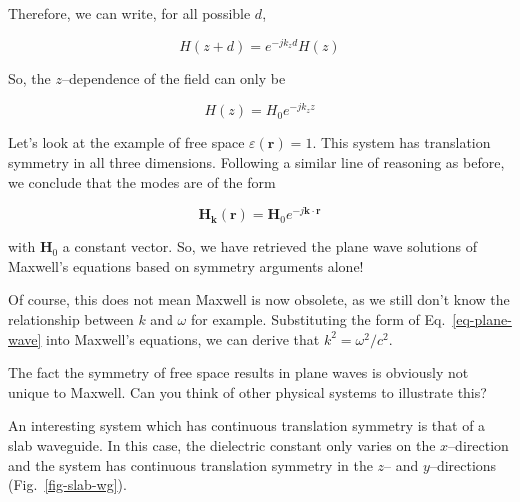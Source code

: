 Therefore, we can write, for all possible $d$, 

\begin{equation}
H(z + d) = e^{-j k_z d}H(z) \label{eq-bloch-degenerate}
\end{equation} 

So, the $z$--dependence of the field can only be

\begin{equation}
H(z) = H_0 e^{-j k_z z}
\end{equation} 

Let's look at the example of free space $\varepsilon({\mathbf r})=1$. This system has translation symmetry in all three dimensions. Following a similar line of reasoning as before, we conclude that the modes are of the form

\begin{equation}
{\mathbf H}_{\mathbf k}({\mathbf r}) = {\mathbf H}_0 e^{-j {\mathbf k} \cdot {\mathbf r}} \label{eq-plane-wave}
\end{equation} 

with ${\mathbf H}_0$ a constant vector. So, we have retrieved the plane wave solutions of Maxwell's equations based on symmetry arguments alone!

Of course, this does not mean Maxwell is now obsolete, as we still don't know the relationship between $k$ and $\omega$ for example. Substituting the form of Eq.~\ref{eq-plane-wave} into Maxwell's equations, we can derive that $k^2 = \omega^2 / c^2$.

\begin{cue}
The fact the symmetry of free space results in plane waves is obviously not unique to Maxwell. Can you think of other physical systems to illustrate this?
\end{cue}


\pagebreak


An interesting system which has continuous translation symmetry is that of a slab waveguide. In this case, the dielectric constant only varies on the $x$--direction and the system has continuous translation symmetry in the $z$-- and $y$--directions (Fig.~\ref{fig-slab-wg}). 

